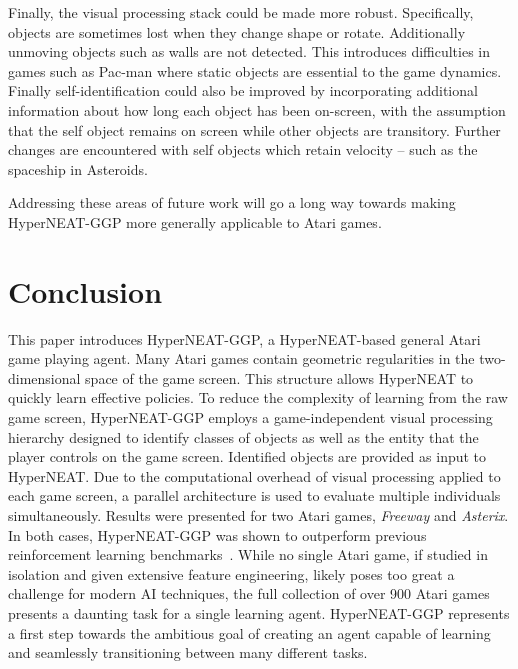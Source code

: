 \documentclass{sig-alternate}
\begin{document}

Finally, the visual processing stack could be made more robust. Specifically, objects are sometimes lost when they change shape or rotate. Additionally unmoving objects such as walls are not detected. This introduces difficulties in games such as Pac-man where static objects are essential to the game dynamics. Finally self-identification could also be improved by incorporating additional information about how long each object has been on-screen, with the assumption that the self object remains on screen while other objects are transitory. Further changes are encountered with self objects which retain velocity -- such as the spaceship in Asteroids. 

Addressing these areas of future work will go a long way towards making HyperNEAT-GGP more generally applicable to Atari games.

\section{Conclusion}
\label{sec:conclusion}
This paper introduces HyperNEAT-GGP, a HyperNEAT-based general Atari game playing agent. Many Atari games contain geometric regularities in the two-dimensional space of the game screen. This structure allows HyperNEAT to quickly learn effective policies. To reduce the complexity of learning from the raw game screen, HyperNEAT-GGP employs a game-independent visual processing hierarchy designed to identify classes of objects as well as the entity that the player controls on the game screen. Identified objects are provided as input to HyperNEAT. Due to the computational overhead of visual processing applied to each game screen, a parallel architecture is used to evaluate multiple individuals simultaneously. Results were presented for two Atari games, \textit{Freeway} and \textit{Asterix}. In both cases, HyperNEAT-GGP was shown to outperform previous reinforcement learning benchmarks~\cite{naddaf10}. While no single Atari game, if studied in isolation and given extensive feature engineering, likely poses too great a challenge for modern AI techniques, the full collection of over 900 Atari games presents a daunting task for a single learning agent. HyperNEAT-GGP represents a first step towards the ambitious goal of creating an agent capable of learning and seamlessly transitioning between many different tasks.
\end{document}
